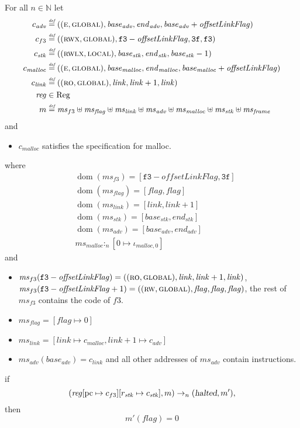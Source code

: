 \documentclass[a4paper]{article}
\newcommand{\update}[2]{[#1 \mapsto #2]}
\newcommand{\defeq}{\stackrel{\textit{\tiny{def}}}{=}}
\DeclareMathOperator{\dom}{dom}
\newcommand{\var}[1]{\mathit{#1}}
\newcommand{\hs}{\var{ms}}
\newcommand{\ms}{\hs}
\newcommand{\pcreg}{\mathrm{pc}}
\newcommand{\start}{\var{base}}
\newcommand{\addrend}{\var{end}}
\newcommand{\reg}{\var{reg}}
\newcommand{\heap}{\var{mem}}
\newcommand{\adv}{\var{adv}}
\newcommand{\link}{\var{link}}
\newcommand{\stk}{\var{stk}}
\newcommand{\flag}{\var{flag}}
\newcommand{\olf}{\var{offsetLinkFlag}}
\newcommand{\halted}{\textsl{halted}}
\newcommand{\heapSat}[3][\heap]{#1 :_{#2} #3}
\newcommand{\codelabel}[1]{\mathit{#1}}
\newcommand{\malloc}{\codelabel{malloc}}
\newcommand{\plaindom}[1]{\mathrm{#1}}
\newcommand{\Regs}{\plaindom{Reg}}
\newcommand{\nats}{\mathbb{N}}
\newcommand{\plainperm}[1]{\textsc{#1}}
\newcommand{\readonly}{\plainperm{ro}}
\newcommand{\readwrite}{\plainperm{rw}}
\newcommand{\entry}{\plainperm{e}}
\newcommand{\rwx}{\plainperm{rwx}}
\newcommand{\rwlx}{\plainperm{rwlx}}
\newcommand{\local}{\plainperm{local}}
\newcommand{\glob}{\plainperm{global}}
\newcommand{\step}[1][]{\rightarrow_{#1}}
\begin{document}
\begin{lemma}
  \label{lem:correctness-f3}
  For all $n \in \nats$
  let
  \begin{align*}
    c_{\var{adv}} & \defeq ((\entry,\glob),\start_{\adv},\addrend_{\adv},\start_{\adv}+\olf) \\
    c_{f3} & \defeq ((\rwx,\glob),\mathtt{f3}-\olf,\mathtt{3f},\mathtt{f3}) \\
    c_{\var{stk}} & \defeq ((\rwlx,\local),\start_\stk,\addrend_\stk,\start_\stk-1) \\
    c_\malloc & \defeq ((\entry,\glob),\start_\malloc,\addrend_\malloc,\start_\malloc+\olf) \\
    c_\link & \defeq ((\readonly,\glob),\link,\link+1,\link) \\
    \reg & \in \Regs \\
    m & \defeq \hs_{f3} \uplus 
        \hs_\flag \uplus                
        \ms_{\var{link}} \uplus 
        \hs_\adv \uplus 
        \ms_{\malloc} \uplus 
        \ms_{\var{stk}} \uplus
        \ms_{\var{frame}} 
  \end{align*}
  and
  \begin{itemize}
  \item $c_\malloc$ satisfies the specification for malloc.
  \end{itemize}
  where 
  \begin{align*}
    &\dom(\hs_{f3}) = [\mathtt{f3}-\olf,\mathtt{3f}] \\
    &\dom(\hs_\flag) = [\flag,\flag] \\
    &\dom(\ms_\link) = [\link,\link+1]\\
    &\dom(\ms_\stk) = [\start_\stk, \addrend_\stk]\\
    &\dom(\hs_{\adv}) = [\start_\adv,\addrend_\adv] \\
    &\heapSat[\hs_{\malloc}]{n}{[0 \mapsto \iota_{\malloc,0}]}
  \end{align*}
  and
  \begin{itemize}
  \item $\ms_{f3}(\mathtt{f3}-\olf) = ((\readonly,\glob),\link,\link+1,\link)$, $\ms_{f3}(\mathtt{f3}-\olf+1) = ((\readwrite,\glob),\flag,\flag,\flag)$, the rest of $\hs_{f3}$ contains the code of $f3$.
  \item $\ms_\flag = [\flag \mapsto 0]$
  \item $\ms_{\var{link}} = [\var{link} \mapsto c_\malloc, \var{link} + 1 \mapsto c_\adv]$
  \item $\hs_\adv(\start_\adv) = c_\link$ and all other addresses of $\ms_\adv$ contain instructions.
  \end{itemize}
  if 
  \[
    (\reg\update{\pcreg}{c_{f3}}\update{r_\stk}{c_\stk},m) \step[n] (\halted,m'),
  \]
  then
  \[
    m'(\flag) = 0
  \]  
\end{lemma}
\end{document}
